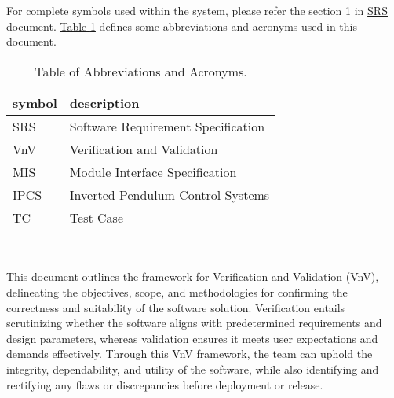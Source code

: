 \documentclass[12pt, titlepage]{article}
\begin{document}
For complete symbols used within the system, please refer the section 1 in 
\href{https://github.com/mirzaim/ipcs/blob/main/docs/SRS/SRS.pdf}{SRS} document.
\hyperref[table_abb]{Table \ref*{table_abb}} defines some
abbreviations and acronyms used in this document.


\begin{table}[!h]
  \centering
  \caption{Table of Abbreviations and Acronyms.}
  \renewcommand{\arraystretch}{1.2}
  \begin{tabular}{l l} 
    \toprule		
    \textbf{symbol} & \textbf{description}\\
    \midrule 
    SRS & Software Requirement Specification\\
    VnV & Verification and Validation \\ 
    MIS & Module Interface Specification \\
    IPCS & Inverted Pendulum Control Systems \\ 
    TC & Test Case \\
    \bottomrule 
  \end{tabular}\\
  \label{table_abb}
\end{table}



\newpage


This document outlines the framework for Verification and Validation (VnV), 
delineating the objectives, scope, and methodologies for confirming 
the correctness and suitability of the software solution. Verification entails 
scrutinizing whether the software aligns with predetermined requirements and 
design parameters, whereas validation ensures it meets user expectations and 
demands effectively. Through this VnV framework, the team can uphold the integrity, 
dependability, and utility of the software, while also identifying and 
rectifying any flaws or discrepancies before deployment or release. 
\end{document}
